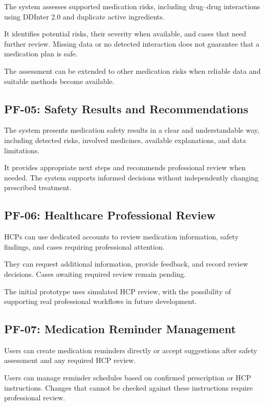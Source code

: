 The system assesses supported medication
risks, including drug--drug interactions
using DDInter 2.0 and duplicate active
ingredients.

It identifies potential risks, their
severity when available, and cases
that need further review. Missing data
or no detected interaction does not
guarantee that a medication plan is safe.

The assessment can be extended to other
medication risks when reliable data
and suitable methods become available.

\subsection{PF-05: Safety Results and Recommendations}

The system presents medication safety
results in a clear and understandable way,
including detected risks, involved medicines,
available explanations, and data limitations.

It provides appropriate next steps and
recommends professional review when needed.
The system supports informed decisions
without independently changing prescribed
treatment.

\subsection{PF-06: Healthcare Professional Review}

HCPs can use dedicated accounts to review
medication information, safety findings,
and cases requiring professional attention.

They can request additional information,
provide feedback, and record review decisions.
Cases awaiting required review remain pending.

The initial prototype uses simulated
HCP review, with the possibility of
supporting real professional workflows
in future development.

\subsection{PF-07: Medication Reminder Management}

Users can create medication reminders
directly or accept suggestions after
safety assessment and any required
HCP review.

Users can manage reminder schedules
based on confirmed prescription or
HCP instructions. Changes that cannot
be checked against these instructions
require professional review.

